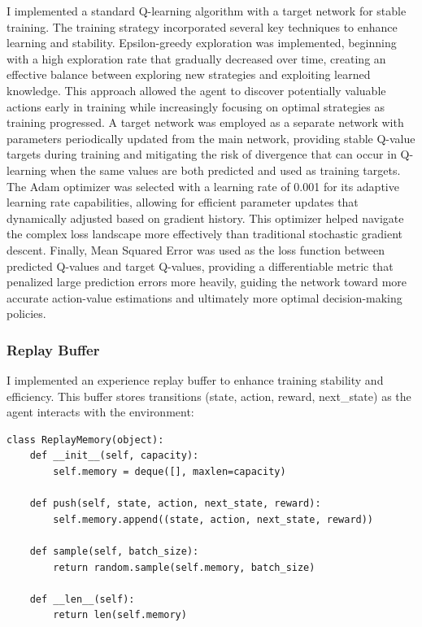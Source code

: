 I implemented a standard Q-learning algorithm with a target network for stable training. 
The training strategy incorporated several key techniques to enhance learning and stability. 
Epsilon-greedy exploration was implemented, beginning with a high exploration rate that gradually decreased over time, creating an effective balance between exploring new strategies and exploiting learned knowledge. 
This approach allowed the agent to discover potentially valuable actions early in training while increasingly focusing on optimal strategies as training progressed. 
A target network was employed as a separate network with parameters periodically updated from the main network, providing stable Q-value targets during training and mitigating the risk of divergence that can occur in Q-learning when the same values are both predicted and used as training targets.
The Adam optimizer was selected with a learning rate of 0.001 for its adaptive learning rate capabilities, allowing for efficient parameter updates that dynamically adjusted based on gradient history. 
This optimizer helped navigate the complex loss landscape more effectively than traditional stochastic gradient descent. 
Finally, Mean Squared Error was used as the loss function between predicted Q-values and target Q-values, providing a differentiable metric that penalized large prediction errors more heavily, guiding the network toward more accurate action-value estimations and ultimately more optimal decision-making policies.

\subsubsection{Replay Buffer}

I implemented an experience replay buffer to enhance training stability and efficiency. 
This buffer stores transitions (state, action, reward, next\_state) as the agent interacts with the environment:

\singlespaced
\begin{verbatim}
class ReplayMemory(object):
    def __init__(self, capacity):
        self.memory = deque([], maxlen=capacity)
    
    def push(self, state, action, next_state, reward):
        self.memory.append((state, action, next_state, reward))
    
    def sample(self, batch_size):
        return random.sample(self.memory, batch_size)
    
    def __len__(self):
        return len(self.memory)
\end{verbatim}
\doublespaced

